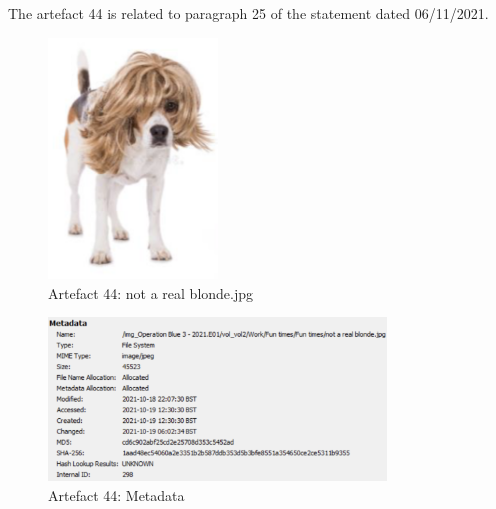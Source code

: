 The artefact 44 is related to paragraph 25 of the statement dated 06/11/2021.
\begin{figure}[H]
  \centering
  \includegraphics[width=0.4\textwidth]{figures/artefact44}
  \caption{Artefact 44: not a real blonde.jpg}
  \label{f:artefact44}
\end{figure}
\begin{figure}[H]
  \centering
  \includegraphics[width=0.8\textwidth]{figures/meta44}
  \caption{Artefact 44: Metadata}
  \label{f:meta44}
\end{figure}

